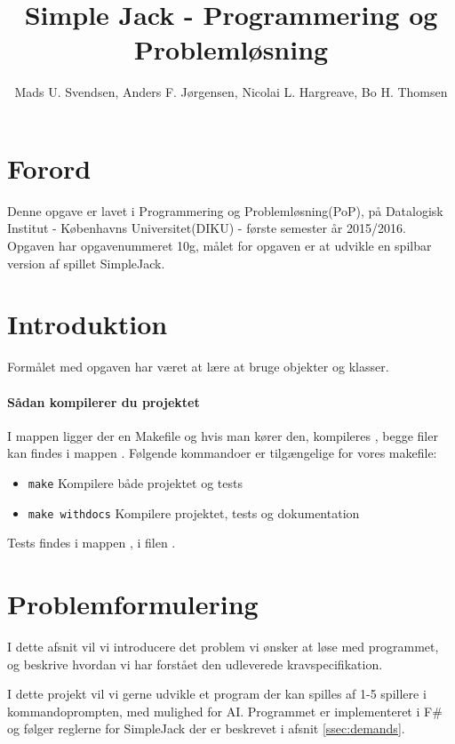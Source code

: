 \documentclass[a4paper]{article}
\title{Simple Jack - Programmering og Problemløsning}
\author{Mads U. Svendsen, Anders F. Jørgensen, Nicolai L. Hargreave, Bo H. Thomsen}
\newcommand{\namedref}[1]{\autoref{#1}} %
\begin{document}
	\maketitle %
        
  \tableofcontents

\section{Forord}
  Denne opgave er lavet i Programmering og Problemløsning(PoP),
    på Datalogisk Institut - Københavns Universitet(DIKU) - første semester år 2015/2016.
    Opgaven har opgavenummeret 10g, målet for opgaven er at
    udvikle en spilbar version af spillet SimpleJack.

\newpage
    
\section{Introduktion} \label{sec:introduction}
   Formålet med opgaven har været at lære at bruge objekter og klasser.

  \paragraph*{Sådan kompilerer du projektet\\}
    I  mappen ligger der en Makefile og hvis man kører den, 
    kompileres ,
    begge filer kan findes i mappen .
    Følgende kommandoer er tilgængelige for vores makefile:
    \begin{itemize}
      \item \lstinline$make$ Kompilere både projektet og tests
      \item \lstinline$make withdocs$ Kompilere projektet, tests og dokumentation
    \end{itemize}

    Tests findes i  mappen , i filen .

\section{Problemformulering} \label{sec:problem}
  I dette afsnit vil vi introducere det problem vi ønsker at løse med programmet,
  og beskrive hvordan vi har forstået den udleverede kravspecifikation.

  I dette projekt vil vi gerne udvikle et program der kan spilles af 1-5 spillere i kommandoprompten,
  med mulighed for AI. Programmet er implementeret i F\# og følger reglerne for SimpleJack der er beskrevet i afsnit \namedref{ssec:demands}.
\end{document}
